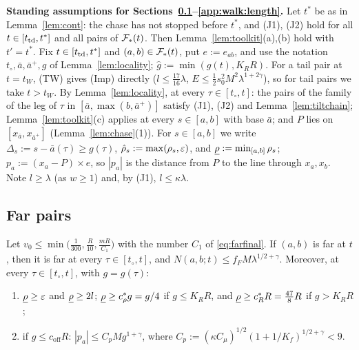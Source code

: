 \textbf{Standing assumptions for Sections~\ref{app:walk:far}--\ref{app:walk:length}.} Let $t^*$ be as in
Lemma~\ref{lem:cont}: the chase has not stopped before $t^*$, and (J1), (J2) hold for all $t\in[t_{\mathrm{td}},t^*]$ and all
pairs of $\mathcal{F}_*(t)$. Then Lemma~\ref{lem:toolkit}(a),(b) hold with $t'=t^*$. Fix $t\in[t_{\mathrm{td}},t^*]$ and
$(a,b)\in\mathcal{F}_*(t)$, put $e:=e_{ab}$, and use the notation $t_\circ,\bar a,\bar a^+,g$ of Lemma~\ref{lem:locality};
$\hat g:=\min(g(t),K_RR)$. For a tail pair at $t=t_W$, (TW) gives (Imp) directly ($l\le\frac{17}{16}\lambda$,
$E\le\frac12s_0^2M^2\lambda^{1+2\gamma}$), so for tail pairs we take $t>t_W$. By Lemma~\ref{lem:locality}, at every
$\tau\in[t_\circ,t]$: the pairs of the family of the leg of $\tau$ in $[\bar a,\max(b,\bar a^+)]$ satisfy (J1), (J2) and
Lemma~\ref{lem:tiltchain}; Lemma~\ref{lem:toolkit}(c) applies at every $s\in[a,b]$ with base $\bar a$; and $P$ lies on
$[x_{\bar a},x_{\bar a^+}]$ (Lemma~\ref{lem:chase}(1)). For $s\in[a,b]$ we write $\Delta_s:=s-\bar a(\tau)\ge g(\tau)$, $\hat\rho_s:=\max(\rho_s,\varepsilon)$, and
$\underline{\rho}:=\min_{[a,b]}\rho_s$; $p_a:=(x_a-P)\times e$, so $|p_a|$ is the distance from $P$ to the line through
$x_a,x_b$. Note $l\ge\lambda$ (as $w\ge1$) and, by (J1), $l\le\kappa\lambda$.

\subsection{Far pairs}\label{app:walk:far}

\begin{proposition}\label{prop:far}
Let $v_0\le\min\bigl(\frac1{300},\frac R{10},\frac{mR}{C_1}\bigr)$ with the number $C_1$ of \eqref{eq:farfinal}. If
$(a,b)$ is far at $t$, then it is far at every $\tau\in[t_\circ,t]$, and $N(a,b;t)\le f_FM\lambda^{1/2+\gamma}$.
Moreover, at every $\tau\in[t_\circ,t]$, with $g=g(\tau)$:
\begin{enumerate}
\setlength{\itemsep}{1pt}\setlength{\parskip}{0pt}
\item[(i)] $\underline{\rho}\ge\varepsilon$ and $\underline{\rho}\ge2l$; $\underline{\rho}\ge c_\rho^*g=g/4$ if $g\le K_RR$, and
$\underline{\rho}\ge c_R^*R=\frac{47}8R$ if $g>K_RR$;
\item[(ii)] if $g\le c_{\mathrm{off}}R$: $|p_a|\le C_pMg^{1+\gamma}$, where $C_p:=(\kappa C_\mu)^{1/2}(1+1/K_f)^{1/2+\gamma}<9$.
\end{enumerate}
\end{proposition}

